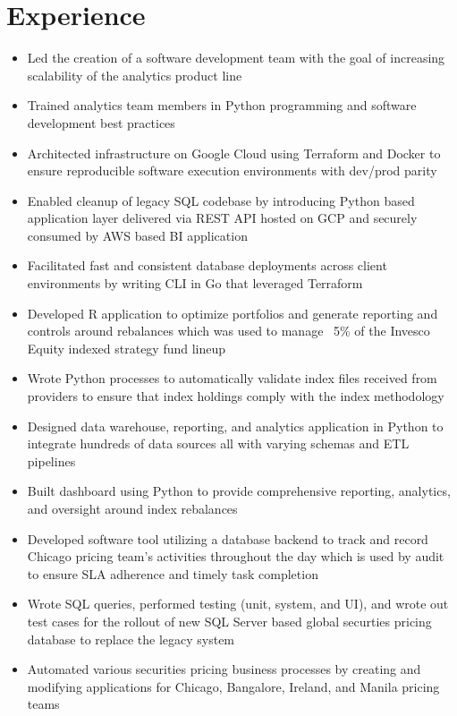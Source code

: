 \documentclass[11pt,a4paper,sans]{moderncv}
\begin{document}
\makecvtitle

\section{Experience}
\begin{itemize}
\item Led the creation of a software development team with the goal of increasing scalability of the analytics product line
\item Trained analytics team members in Python programming and software development best practices
\item Architected infrastructure on Google Cloud using Terraform and Docker to ensure reproducible software execution environments with dev/prod parity
\item Enabled cleanup of legacy SQL codebase by introducing Python based application layer delivered via REST API hosted on GCP and securely consumed by AWS based BI application
\item Facilitated fast and consistent database deployments across client environments by writing CLI in Go that leveraged Terraform
\end{itemize}
\vspace{5mm}

\begin{itemize}
\item Developed R application to optimize portfolios and generate reporting and controls around rebalances which was used to manage ~5\% of the Invesco Equity indexed strategy fund lineup
\item Wrote Python processes to automatically validate index files received from providers to ensure that index holdings comply with the index methodology
\item Designed data warehouse, reporting, and analytics application in Python to integrate hundreds of data sources all with varying schemas and ETL pipelines
\item Built dashboard using Python to provide comprehensive reporting, analytics, and oversight around index rebalances
\end{itemize}
\vspace{5mm}
\begin{itemize}
\item Developed software tool utilizing a database backend to track and record Chicago pricing team's activities throughout the day which is used by audit to ensure SLA adherence and timely task completion
\item Wrote SQL queries, performed testing (unit, system, and UI), and wrote out test cases for the rollout of new SQL Server based global securties pricing database to replace the legacy system
\item Automated various securities pricing business processes by creating and modifying applications for Chicago, Bangalore, Ireland, and Manila pricing teams
\end{itemize}
\end{document}
